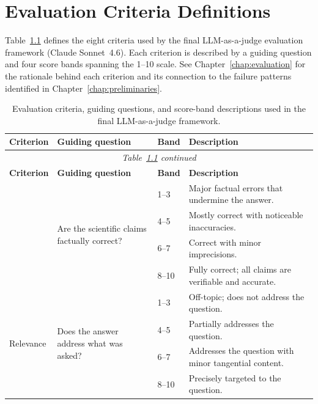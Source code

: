 \chapter{Evaluation Criteria Definitions}\label{app:eval-criteria}

Table~\ref{tab:eval-criteria-full} defines the eight criteria used by the
final LLM-as-a-judge evaluation framework (Claude Sonnet~4.6). Each criterion
is described by a guiding question and four score bands spanning the 1--10
scale. See Chapter~\ref{chap:evaluation} for the rationale behind each
criterion and its connection to the failure patterns identified in
Chapter~\ref{chap:preliminaries}.

\begin{longtable}{@{}p{2.6cm} p{4.0cm} p{1.2cm} p{6.0cm}@{}}
\caption{Evaluation criteria, guiding questions, and score-band
descriptions used in the final LLM-as-a-judge framework.}
\label{tab:eval-criteria-full} \\
\toprule
\textbf{Criterion} & \textbf{Guiding question} & \textbf{Band} & \textbf{Description} \\
\midrule
\endfirsthead

\multicolumn{4}{c}{\small\emph{Table~\ref{tab:eval-criteria-full} continued}} \\
\toprule
\textbf{Criterion} & \textbf{Guiding question} & \textbf{Band} & \textbf{Description} \\
\midrule
\endhead

\bottomrule
\endfoot

\multirow{4}{2.6cm}{Scientific Accuracy}
& \multirow{4}{4.0cm}{Are the scientific claims factually correct?}
& 1--3 & Major factual errors that undermine the answer. \\
& & 4--5 & Mostly correct with noticeable inaccuracies. \\
& & 6--7 & Correct with minor imprecisions. \\
& & 8--10 & Fully correct; all claims are verifiable and accurate. \\
\midrule

\multirow{4}{2.6cm}{Relevance}
& \multirow{4}{4.0cm}{Does the answer address what was asked?}
& 1--3 & Off-topic; does not address the question. \\
& & 4--5 & Partially addresses the question. \\
& & 6--7 & Addresses the question with minor tangential content. \\
& & 8--10 & Precisely targeted to the question. \\
\midrule


\end{longtable}
